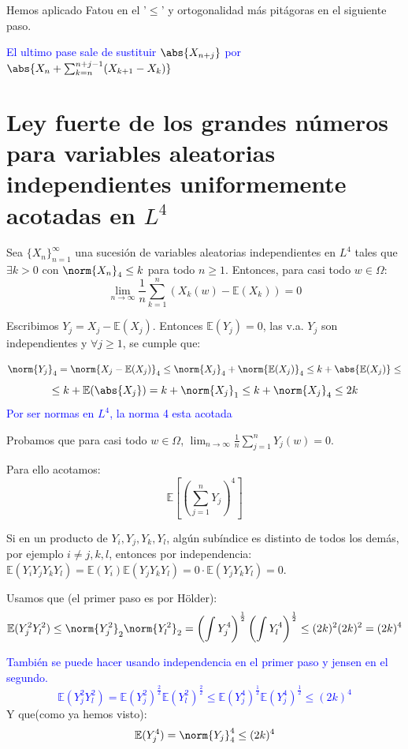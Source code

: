\documentclass{apuntes}
\begin{document}
Hemos aplicado Fatou en el '$\leq$' y ortogonalidad más pitágoras en el siguiente paso.


\textcolor{blue}{El ultimo pase sale de sustituir $\abs{X_{n+j}}$ por $\abs{X_n + \sum_{k=n}^{n+j-1}(X_{k+1}-X_k)}$}


\section{Ley fuerte de los grandes números para variables aleatorias independientes uniformemente acotadas en $L^4$}
Sea $\{X_n\}_{n=1}^{\infty}$ una sucesión de variables aleatorias independientes en $L^4$ tales que $\exists k>0$ con $\norm{X_n}_4 \leq k$ para todo $n \geq 1$. Entonces, para casi todo $w \in \Omega$:
\[
\lim_{n \rightarrow \infty} \frac{1}{n}\sum_{k=1}^{n}\left( X_k(w) - \mathbb{E}(X_k) \right)= 0
\]


Escribimos $Y_j=X_j-\mathbb{E}(X_j)$. Entonces $\mathbb{E}(Y_j)=0$, las v.a. $Y_j$ son independientes y $\forall j \geq 1$, se cumple que:

\[
\norm{Y_j}_4 = \norm{X_j - \mathbb{E}(X_j)}_4 \leq \norm{X_j}_4 + \norm{\mathbb{E}(X_j)}_4 \leq k + \abs{\mathbb{E}(X_j)} \leq
\]
\[
\leq k + \mathbb{E}(\abs{X_j}) = k + \norm{X_j}_1 \leq k + \norm{X_j}_4 \leq 2k
\]
\textcolor{blue}{Por ser normas en $L^4$, la norma 4 esta acotada}

Probamos que para casi todo $w \in \Omega$, $\lim_{n \rightarrow \infty} \frac{1}{n} \sum_{j=1}^{n}Y_j(w)=0$. 

Para ello acotamos:
\[
\mathbb{E}\left[ (\sum_{j=1}^{n} Y_j)^4 \right]
\] 

Si en un producto de $Y_i, Y_j, Y_k, Y_l$, algún subíndice es distinto de todos los demás, por ejemplo $i\neq j,k,l$, entonces por independencia: $\mathbb{E}(Y_i Y_j Y_k Y_l)=\mathbb{E}(Y_i)\mathbb{E}(Y_j Y_k Y_l) = 0 \cdot \mathbb{E}(Y_j Y_k Y_l) = 0$.

Usamos que (el primer paso es por Hölder):
\[
\mathbb{E}(Y_j^2 Y_l^2) \leq \norm{Y_j^2}_2 \norm{Y_l^2}_2 = \left( \int Y_j^4\right)^{\frac{1}{2}} \left( \int Y_l^4\right)^{\frac{1}{2}} \leq (2k)^2(2k)^2=(2k)^4 
\]

\textcolor{blue}{También se puede hacer usando independencia en el primer paso y jensen en el segundo.
\[
\mathbb{E}(Y_j^2 Y_l^2) = \mathbb{E}(Y_j^2)^\frac{2}{2} \mathbb{E}(Y_l^2)^\frac{2}{2} \leq \mathbb{E}(Y_j^4)^\frac{1}{2}\mathbb{E}(Y_j^4)^\frac{1}{2}\leq(2k)^4
\]
}
Y que(como ya hemos visto):
\[
\mathbb{E}(Y_j^4) = \norm{Y_j}_4^4\leq(2k)^4
\]
\end{document}
